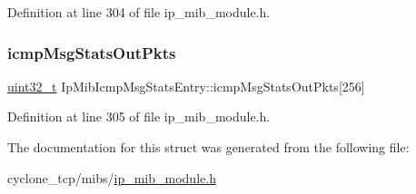 Definition at line 304 of file ip\+\_\+mib\+\_\+module.\+h.

\mbox{\label{structIpMibIcmpMsgStatsEntry_a2c25425bd4fa6a85335e2af2c16d90d5}} 
\subsubsection{\texorpdfstring{icmp\+Msg\+Stats\+Out\+Pkts}{icmpMsgStatsOutPkts}}
{\footnotesize\ttfamily \hyperlink{stdint_8h_a435d1572bf3f880d55459d9805097f62}{uint32\+\_\+t} Ip\+Mib\+Icmp\+Msg\+Stats\+Entry\+::icmp\+Msg\+Stats\+Out\+Pkts\mbox{[}256\mbox{]}}



Definition at line 305 of file ip\+\_\+mib\+\_\+module.\+h.



The documentation for this struct was generated from the following file\+:\begin{DoxyCompactItemize}
\item 
cyclone\+\_\+tcp/mibs/\hyperlink{ip__mib__module_8h}{ip\+\_\+mib\+\_\+module.\+h}\end{DoxyCompactItemize}
